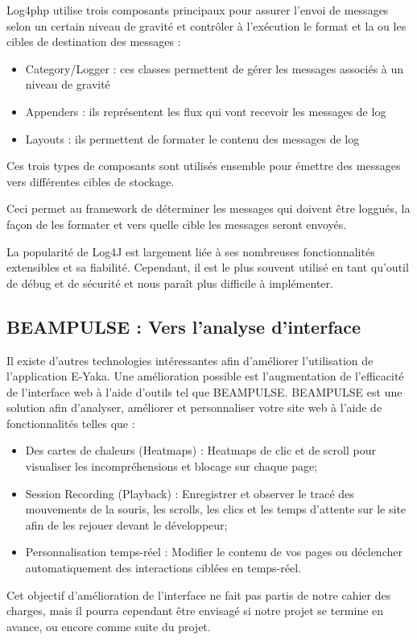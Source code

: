             Log4php utilise trois composants principaux pour assurer l'envoi de messages selon un certain niveau de gravité et contrôler à l'exécution le format et la ou les cibles de destination des messages :

            \begin{itemize}
                \item Category/Logger : ces classes permettent de gérer les messages associés à un niveau de gravité
                \item Appenders : ils représentent les flux qui vont recevoir les messages de log
                \item Layouts : ils permettent de formater le contenu des messages de log

            \end{itemize}

            Ces trois types de composants sont utilisés ensemble pour émettre des messages vers différentes cibles de stockage.

            Ceci permet au framework de déterminer les messages qui doivent être loggués, la façon de les formater et vers quelle cible les messages seront envoyés.

            La popularité de Log4J est largement liée à  ses nombreuses fonctionnalités extensibles et sa fiabilité. Cependant, il est le plus souvent utilisé en tant qu'outil de débug et de sécurité et nous paraît plus difficile à implémenter.
        
        \subsection{BEAMPULSE : Vers l'analyse d'interface}
        
            Il existe d'autres technologies intéressantes afin d'améliorer l'utilisation de l'application E-Yaka. Une  amélioration possible est l'augmentation de l'efficacité de l'interface web à l'aide d'outils tel que BEAMPULSE. BEAMPULSE est une solution afin d'analyser, améliorer et personnaliser votre site web à l'aide de fonctionnalités telles que :
            \begin{itemize}
                \item Des cartes de chaleurs (Heatmaps) : Heatmaps de clic et de scroll pour visualiser les incompréhensions et blocage sur chaque page;
                \item Session Recording (Playback) : Enregistrer et observer le tracé des mouvements de la souris, les scrolls, les clics et les temps d'attente sur le site afin de les rejouer devant le développeur;
                \item Personnalisation temps-réel : Modifier le contenu de vos pages ou déclencher automa\-tiquement des interactions ciblées en temps-réel.
            \end{itemize}
            
            Cet objectif d'amélioration de l'interface ne fait pas partis de notre cahier des charges, mais il pourra cependant être envisagé si notre projet se termine en avance, ou encore comme suite du projet.
        
